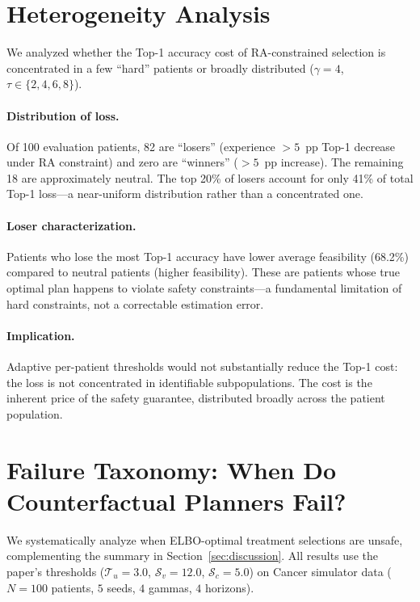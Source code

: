 \documentclass{article}
\newcommand{\cT}{\mathcal{T}}
\newcommand{\cS}{\mathcal{S}}
\begin{document}
\section{Heterogeneity Analysis}
\label{app:heterogeneity}

We analyzed whether the Top-1 accuracy cost of RA-constrained selection is concentrated in a few ``hard'' patients or broadly distributed ($\gamma = 4$, $\tau \in \{2,4,6,8\}$).

\paragraph{Distribution of loss.} Of 100 evaluation patients, 82 are ``losers'' (experience $>5$~pp Top-1 decrease under RA constraint) and zero are ``winners'' ($>5$~pp increase). The remaining 18 are approximately neutral. The top 20\% of losers account for only 41\% of total Top-1 loss---a near-uniform distribution rather than a concentrated one.

\paragraph{Loser characterization.} Patients who lose the most Top-1 accuracy have lower average feasibility (68.2\%) compared to neutral patients (higher feasibility). These are patients whose true optimal plan happens to violate safety constraints---a fundamental limitation of hard constraints, not a correctable estimation error.

\paragraph{Implication.} Adaptive per-patient thresholds would not substantially reduce the Top-1 cost: the loss is not concentrated in identifiable subpopulations. The cost is the inherent price of the safety guarantee, distributed broadly across the patient population.


\section{Failure Taxonomy: When Do Counterfactual Planners Fail?}
\label{app:failure_taxonomy}

We systematically analyze when ELBO-optimal treatment selections are unsafe, complementing the summary in Section~\ref{sec:discussion}. All results use the paper's thresholds ($\cT_u = 3.0$, $\cS_v = 12.0$, $\cS_c = 5.0$) on Cancer simulator data ($N = 100$ patients, $5$ seeds, $4$ gammas, $4$ horizons).
\end{document}
